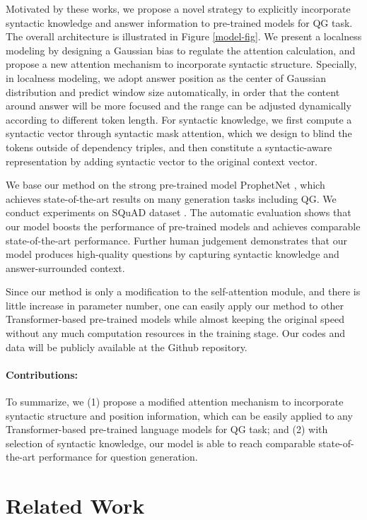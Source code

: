 \documentclass[11pt]{article}
\begin{document}
Motivated by these works, we propose a novel strategy to explicitly incorporate syntactic knowledge and answer information to pre-trained models for QG task. The overall architecture is illustrated in Figure \ref{model-fig}. 
We present a localness modeling by designing a Gaussian bias to regulate the attention calculation, and propose a new attention mechanism to incorporate syntactic structure. Specially, in localness modeling, we adopt answer position as the center of Gaussian distribution and predict window size automatically, in order that the content around answer will be more focused and the range can be adjusted dynamically according to different token length. For syntactic knowledge, 
we first compute a syntactic vector through syntactic mask attention, which we design to blind the tokens outside of dependency triples, and then constitute a syntactic-aware representation by adding syntactic vector to the original context vector. 


We base our method on the strong pre-trained model ProphetNet \cite{qi-etal-2020-prophetnet}, which achieves state-of-the-art results on many generation tasks including QG. 
We conduct experiments on SQuAD dataset \citep{du-etal-2017-learning}. The automatic evaluation shows that our model boosts the performance of pre-trained models and achieves comparable state-of-the-art performance. Further human judgement demonstrates that our model produces high-quality questions by capturing syntactic knowledge and answer-surrounded context. 

Since our method is only a modification to the self-attention module, and there is little increase in parameter number, 
one can easily apply our method to other Transformer-based pre-trained models while almost keeping the original speed without any much computation resources in the training stage. Our codes and data will be publicly available at the Github repository.

\paragraph{Contributions:}To summarize, we (1) propose a modified attention mechanism to incorporate syntactic structure and position information, which can be easily applied to any Transformer-based pre-trained language models for QG task; and (2) with selection of syntactic knowledge, our model is able to reach comparable state-of-the-art performance for question generation.

\section{Related Work}
\end{document}
